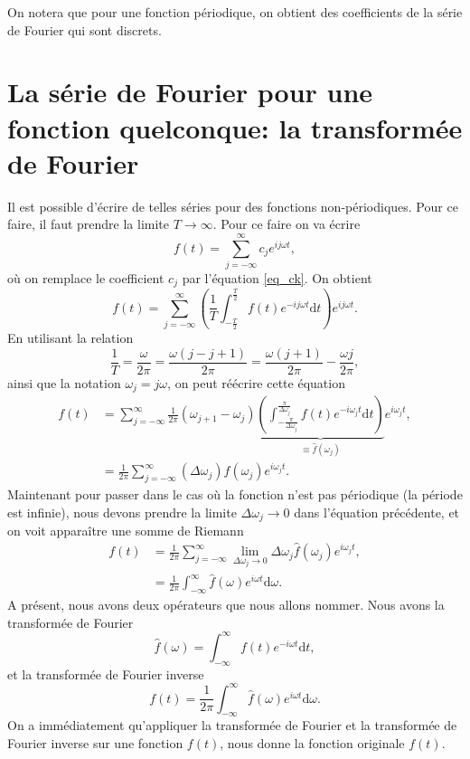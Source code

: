 \documentclass[a4paper,12pt]{book}
\newcommand{\dd}{\mathrm{d}}
\newcommand{\fh}{\hat{f}}
\begin{document}
On notera que pour une fonction périodique, on obtient des coefficients de la série de Fourier qui sont discrets.

\section{La série de Fourier pour une fonction quelconque: la transformée de Fourier}

Il est possible d'écrire de telles séries pour des fonctions non-périodiques. Pour ce faire, il faut prendre la limite $T\rightarrow\infty$. 
Pour ce faire on va écrire
\begin{equation*}
 f(t)=\sum_{j=-\infty}^\infty c_je^{ij\omega t},
\end{equation*}
où on remplace le coefficient $c_j$ par l'équation \eqref{eq_ck}. On obtient
\begin{equation*}
 f(t)=\sum_{j=-\infty}^\infty \left(\frac{1}{T}\int_{-\frac{T}{2}}^{\frac{T}{2}}f(t)e^{-ij\omega t}\dd t\right) e^{ij\omega t}.
\end{equation*}
En utilisant la relation 
\begin{equation*}
 \frac{1}{T}=\frac{\omega}{2\pi}=\frac{\omega(j-j+1)}{2\pi}=\frac{\omega(j+1)}{2\pi}-\frac{\omega j}{2\pi},
\end{equation*}
ainsi que la notation $\omega_j=j\omega$, on peut réécrire cette équation
\begin{align}
 f(t)&=\sum_{j=-\infty}^\infty \frac{1}{2\pi}(\omega_{j+1}-\omega_j)\underbrace{\left(\int_{-\frac{\pi}{\Delta \omega_j}}^{\frac{\pi}{\Delta \omega_j}}f(t)e^{-i\omega_j t}\dd t\right)}_{\equiv \fh(\omega_j)} e^{i\omega_j t},\nonumber\\
     &=\frac{1}{2\pi}\sum_{j=-\infty}^\infty (\Delta \omega_j)\fh(\omega_j) e^{i\omega_j t}.
\end{align}
Maintenant pour passer dans le cas où la fonction n'est pas périodique (la période est infinie), nous
devons prendre la limite $\Delta \omega_j\rightarrow 0$ dans l'équation précédente, et on voit apparaître une somme de Riemann
\begin{align}
 f(t)&=\frac{1}{2\pi}\sum_{j=-\infty}^\infty \lim\limits_{\Delta \omega_j\rightarrow 0}\Delta \omega_j\fh(\omega_j) e^{i\omega_j t},\nonumber\\
 &=\frac{1}{2\pi}\int_{-\infty}^\infty \fh(\omega) e^{i\omega t}\dd\omega.
\end{align}
A présent, nous avons deux opérateurs que nous allons nommer. Nous avons la transformée de Fourier
\begin{equation}
 \fh(\omega)=\int_{-\infty}^{\infty}f(t)e^{-i\omega t}\dd t,\label{eq_fourier_transform}
\end{equation}
et la transformée de Fourier inverse
\begin{equation}
 f(t)=\frac{1}{2\pi}\int_{-\infty}^\infty \fh(\omega) e^{i\omega t}\dd\omega.\label{eq_inverse_fourier_transform}
\end{equation}
On a immédiatement qu'appliquer la transformée de Fourier et la transformée de Fourier inverse sur 
une fonction $f(t)$, nous donne la fonction originale $f(t)$.
\end{document}
